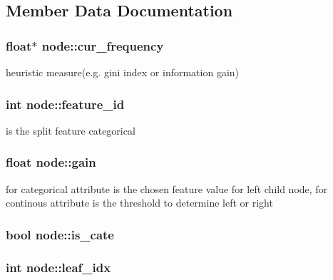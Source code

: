 \subsection{Member Data Documentation}
\hypertarget{classnode_ae4125b554711d8ad9d6726ffd69e0b77}{
\subsubsection[{cur\+\_\+frequency}]{\setlength{\rightskip}{0pt plus 5cm}float$\ast$ node\+::cur\+\_\+frequency}}\label{classnode_ae4125b554711d8ad9d6726ffd69e0b77}
heuristic measure(e.\+g. gini index or information gain) \hypertarget{classnode_ad65aefa2c967c82cd88e6870085d7f3e}{
\subsubsection[{feature\+\_\+id}]{\setlength{\rightskip}{0pt plus 5cm}int node\+::feature\+\_\+id}}\label{classnode_ad65aefa2c967c82cd88e6870085d7f3e}
is the split feature categorical \hypertarget{classnode_a7154054210920a77711f8ddb0cf45941}{
\subsubsection[{gain}]{\setlength{\rightskip}{0pt plus 5cm}float node\+::gain}}\label{classnode_a7154054210920a77711f8ddb0cf45941}
for categorical attribute is the chosen feature value for left child node, for continous attribute is the threshold to determine left or right \hypertarget{classnode_a67c3c0be5001ace8494a6292e8079001}{
\subsubsection[{is\+\_\+cate}]{\setlength{\rightskip}{0pt plus 5cm}bool node\+::is\+\_\+cate}}\label{classnode_a67c3c0be5001ace8494a6292e8079001}
\hypertarget{classnode_abbd7d4174869fead5f901b042a2f9712}{
\subsubsection[{leaf\+\_\+idx}]{\setlength{\rightskip}{0pt plus 5cm}int node\+::leaf\+\_\+idx}}\label{classnode_abbd7d4174869fead5f901b042a2f9712}
